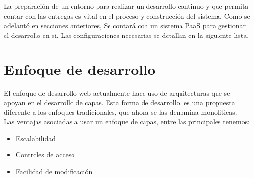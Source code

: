La preparación de un entorno para realizar un desarrollo continuo y que permita contar con las entregas es vital en el proceso y construcción del sistema. Como se adelantó en secciones anteriores, Se contará con un sistema PaaS para gestionar el desarrollo en si. Las configuraciones necesarias se detallan en la siguiente lista.

\section{Enfoque de desarrollo}

El enfoque de desarrollo web actualmente hace uso de arquitecturas que se apoyan en el desarrollo de capas. Esta forma de desarrollo, es una propuesta diferente a los enfoques tradicionales, que ahora se las denomina monoliticas. \citep{MCS:ArqResWb}\\

Las ventajas asociadas a usar un enfoque de capas, entre las principales tenemos:

\begin{itemize}
\item Escalabilidad
\item Controles de acceso
\item Facilidad de modificación
\end{itemize}
